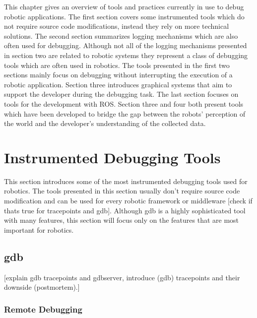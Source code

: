 This chapter gives an overview of tools and practices currently in use to debug robotic applications. The first section covers some instrumented tools which do not require source code modifications, instead they rely on more technical solutions. The second section summarizes logging mechanisms which are also often used for debugging. Although not all of the logging mechanisms presented in section two are related to robotic systems they represent a class of debugging tools which are often used in robotics. The tools presented in the first two sections mainly focus on debugging without interrupting the execution of a robotic application. Section three introduces graphical systems that aim to support the developer during the debugging task. The last section focuses on tools for the development with ROS. Section three and four both present tools which have been developed to bridge the gap between the robots' perception of the world and the developer's understanding of the collected data.


\section{Instrumented Debugging Tools}
This section introduces some of the most instrumented  debugging tools used for robotics. The tools presented in this section usually don't require source code modification and can be used for every robotic framework or middleware [check if thats true for tracepoints and gdb]. Although gdb is a highly sophisticated tool with many features, this section will focus only on the features that are most important for robotics.
\subsection{gdb}
[explain gdb tracepoints and gdbserver, introduce (gdb) tracepoints and their downside (postmortem).]

\subsubsection{Remote Debugging}

